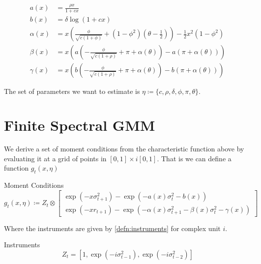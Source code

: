 \documentclass[11pt, letterpaper, twoside, final]{article}
\begin{document}
\begin{align}
    a(x) &= \frac{\rho x}{1 + c x} \\ \label{eqn:a(x)}
    b(x) &= \delta \log \left(1 + c x\right) \\ \label{eqn:b(x)}
    \alpha(x) &= x \left(\frac{\phi}{\sqrt{c (1 + \phi)}}  + (1 - \phi^2)\left(\theta - \frac{1}{2}\right)\right)
    - \frac{1}{2} x^2 (1 - \phi^2) \\ \label{eqn:alpha(x)}
    \beta(x)  &= x \left(a\left(-\frac{\phi}{\sqrt{c(1+ \rho)}} + \pi + \alpha(\theta)\right) -
        a\left(\pi + \alpha(\theta)\right)\right) \\ 
        \label{eqn:beta(x)}
    \gamma(x) &= x \left(b\left(-\frac{\phi}{\sqrt{c(1+\rho)}} + \pi + \alpha(\theta)\right) -
        b\left(\pi + \alpha(\theta)\right) \right)
\end{align}


The set of parameters we want to estimate is $\eta \coloneqq \lbrace c, \rho, \delta, \phi, \pi,
\theta\rbrace$.

\section{Finite Spectral GMM}
\label{sec:spectral_GMM}

We derive a set of moment conditions from the characteristic function above by evaluating it at a grid of points
in $[0,1] \times i [0,1]$. 
That is we can define a function $g_t(x, \eta)$

\begin{defn}{Moment Conditions}
    \begin{equation}
        g_t(x, \eta) \coloneqq Z_t \otimes \begin{bmatrix} \exp(- x \sigma^2_{t+1}) - \exp\left( - a(x) \sigma_t^2
        - b(x) \right) \\ \exp\left(- x r_{t+1}\right) - \exp\left(- \alpha(x) \sigma^2_{t+1} - \beta(x)
        \sigma^2_t - \gamma(x)\right) \end{bmatrix}
    \end{equation}
\end{defn}

Where the instruments are given by \cref{defn:instruments} for complex unit $i$. 

\begin{defn}{Instruments}
    \label{defn:instruments}
    \begin{equation}
        Z_t = \left[1, \exp\left(- i \sigma_{t-1}^2\right), \exp\left(-i \sigma^2_{t-2}\right)\right] 
    \end{equation}
\end{defn}
\end{document}
